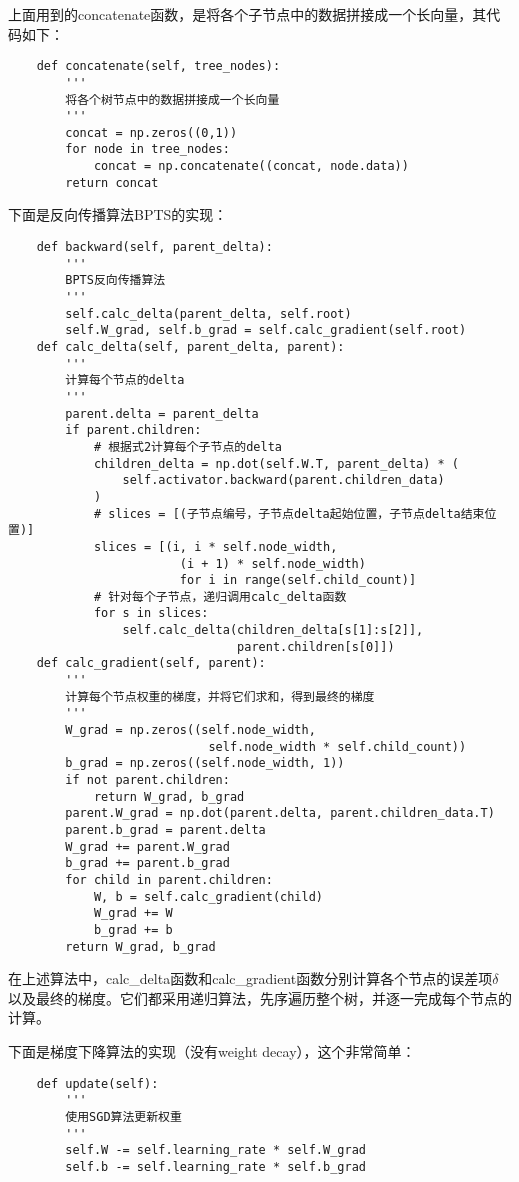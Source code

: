 上面用到的concatenate函数，是将各个子节点中的数据拼接成一个长向量，其代码如下：
\begin{lstlisting}
    def concatenate(self, tree_nodes):
        '''
        将各个树节点中的数据拼接成一个长向量
        '''
        concat = np.zeros((0,1))
        for node in tree_nodes:
            concat = np.concatenate((concat, node.data))
        return concat
\end{lstlisting}

下面是反向传播算法BPTS的实现：
\begin{lstlisting}
    def backward(self, parent_delta):
        '''
        BPTS反向传播算法
        '''
        self.calc_delta(parent_delta, self.root)
        self.W_grad, self.b_grad = self.calc_gradient(self.root)
    def calc_delta(self, parent_delta, parent):
        '''
        计算每个节点的delta
        '''
        parent.delta = parent_delta
        if parent.children:
            # 根据式2计算每个子节点的delta
            children_delta = np.dot(self.W.T, parent_delta) * (
                self.activator.backward(parent.children_data)
            )
            # slices = [(子节点编号，子节点delta起始位置，子节点delta结束位置)]
            slices = [(i, i * self.node_width, 
                        (i + 1) * self.node_width)
                        for i in range(self.child_count)]
            # 针对每个子节点，递归调用calc_delta函数
            for s in slices:
                self.calc_delta(children_delta[s[1]:s[2]], 
                                parent.children[s[0]])
    def calc_gradient(self, parent):
        '''
        计算每个节点权重的梯度，并将它们求和，得到最终的梯度
        '''
        W_grad = np.zeros((self.node_width, 
                            self.node_width * self.child_count))
        b_grad = np.zeros((self.node_width, 1))
        if not parent.children:
            return W_grad, b_grad
        parent.W_grad = np.dot(parent.delta, parent.children_data.T)
        parent.b_grad = parent.delta
        W_grad += parent.W_grad
        b_grad += parent.b_grad
        for child in parent.children:
            W, b = self.calc_gradient(child)
            W_grad += W
            b_grad += b
        return W_grad, b_grad
\end{lstlisting}


在上述算法中，calc\_delta函数和calc\_gradient函数分别计算各个节点的误差项\(\delta\)以及最终的梯度。它们都采用递归算法，先序遍历整个树，并逐一完成每个节点的计算。

下面是梯度下降算法的实现（没有weight decay），这个非常简单：
\begin{lstlisting}
    def update(self):
        '''
        使用SGD算法更新权重
        '''
        self.W -= self.learning_rate * self.W_grad
        self.b -= self.learning_rate * self.b_grad
\end{lstlisting}


